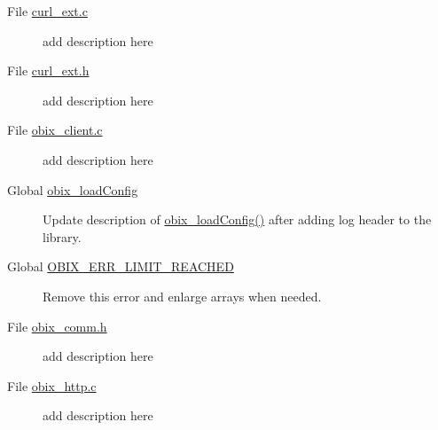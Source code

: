 \label{todo__todo000001}
\hypertarget{todo__todo000001}{}
 \begin{description}
\item[File \hyperlink{curl__ext_8c}{curl\_\-ext.c} ]add description here

\end{description}


\label{todo__todo000002}
\hypertarget{todo__todo000002}{}
 \begin{description}
\item[File \hyperlink{curl__ext_8h}{curl\_\-ext.h} ]add description here

\end{description}


\label{todo__todo000003}
\hypertarget{todo__todo000003}{}
 \begin{description}
\item[File \hyperlink{obix__client_8c}{obix\_\-client.c} ]add description here

\end{description}


\label{todo__todo000004}
\hypertarget{todo__todo000004}{}
 \begin{description}
\item[Global \hyperlink{obix__client_8c_bea2db6474251887a883016e86a02198}{obix\_\-loadConfig} ]Update description of \hyperlink{obix__client_8c_bea2db6474251887a883016e86a02198}{obix\_\-loadConfig()} after adding log header to the library.

\end{description}


\label{todo__todo000005}
\hypertarget{todo__todo000005}{}
 \begin{description}
\item[Global \hyperlink{obix__client_8h_79a73481c0495d24e290870c6d7938289c1ccf413203a3c729060a8ce6a9c438}{OBIX\_\-ERR\_\-LIMIT\_\-REACHED} ]Remove this error and enlarge arrays when needed. \end{description}


\label{todo__todo000006}
\hypertarget{todo__todo000006}{}
 \begin{description}
\item[File \hyperlink{obix__comm_8h}{obix\_\-comm.h} ]add description here

\end{description}


\label{todo__todo000007}
\hypertarget{todo__todo000007}{}
 \begin{description}
\item[File \hyperlink{obix__http_8c}{obix\_\-http.c} ]add description here

\end{description}


